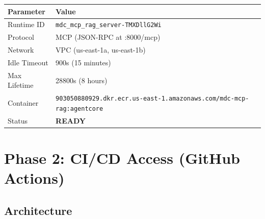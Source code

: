 \documentclass[11pt,letterpaper]{article}
\begin{document}
\begin{table}[H]
\centering
\begin{tabularx}{\textwidth}{lX}
\toprule
\textbf{Parameter} & \textbf{Value} \\
\midrule
Runtime ID & \texttt{mdc\_mcp\_rag\_server-TMXDllG2Wi} \\
Protocol & MCP (JSON-RPC at :8000/mcp) \\
Network & VPC (us-east-1a, us-east-1b) \\
Idle Timeout & 900s (15 minutes) \\
Max Lifetime & 28800s (8 hours) \\
Container & \texttt{903050880929.dkr.ecr.us-east-1.amazonaws.com/mdc-mcp-rag:agentcore} \\
Status & \textbf{READY} \\
\bottomrule
\end{tabularx}
\end{table}

\section{Phase 2: CI/CD Access (GitHub Actions)}

\subsection{Architecture}
\end{document}
